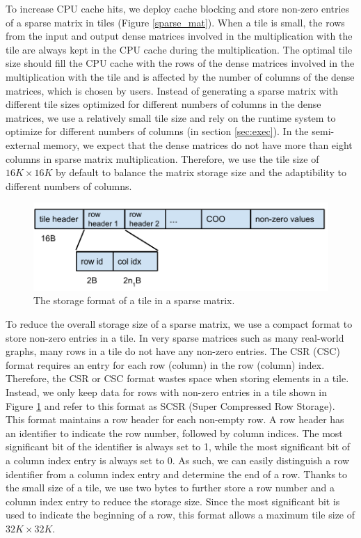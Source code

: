 To increase CPU cache hits, we deploy cache blocking \cite{Im04} and store
non-zero entries of a sparse matrix in tiles (Figure \ref{sparse_mat}).
When a tile is small, the rows from the input and output dense matrices
involved in the multiplication with the tile are always kept in the CPU cache
during the multiplication. The optimal tile size should fill the CPU cache
with the rows of the dense matrices involved in the multiplication with
the tile and is affected by the number of columns of the dense matrices,
which is chosen by users. Instead of generating a sparse matrix with
different tile sizes optimized for different numbers of columns in the dense
matrices, we use a relatively small tile size and rely on the runtime system
to optimize for different numbers of columns (in section \ref{sec:exec}).
In the semi-external memory, we expect that the dense matrices do not
have more than eight columns in sparse matrix multiplication. Therefore, we
use the tile size of $16K \times 16K$ by default to balance the matrix storage
size and the adaptibility to different numbers of columns.

\begin{figure}
\centering
\includegraphics[scale=0.5]{./tile_format.pdf}
\vspace{-5pt}
\caption{The storage format of a tile in a sparse matrix.}
\vspace{-5pt}
\label{tile_format}
\end{figure}

To reduce the overall storage size of a sparse matrix, we use a compact format
to store non-zero entries in a tile. In very sparse matrices such as
many real-world graphs, many rows in a tile do not have any non-zero entries.
The CSR (CSC) format requires an entry for each row (column) in the row
(column) index. Therefore, the CSR or CSC format wastes space when storing elements
in a tile. Instead, we only keep data for rows with non-zero entries in a tile
shown in Figure \ref{tile_format} and refer to this format as SCSR (Super
Compressed Row Storage). This format maintains a row header for each non-empty
row. A row header has an identifier to indicate the row number, followed by
column indices. 
The most significant bit of the identifier is always set to 1, while the most
significant bit of a column index entry is always set to 0. As such, we can easily
distinguish a row identifier from a column index entry and determine the end
of a row. Thanks to the small size of a tile, we use two bytes to further store a row
number and a column index entry to reduce the storage size. Since the most
significant bit is used to indicate the beginning of a row, this format allows
a maximum tile size of $32K \times 32K$.

